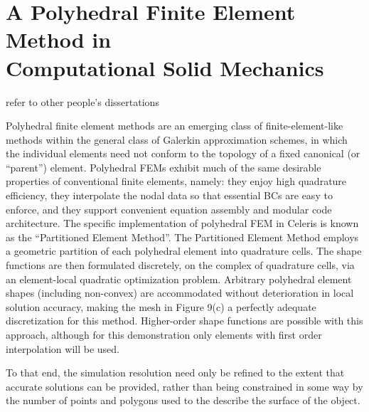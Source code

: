\section[A Polyhedral Finite Element Method in Computational Solid \\ Mechanics]{\texorpdfstring{A Polyhedral Finite Element Method in \\ Computational Solid Mechanics}{A Polyhedral Finite Element Method in Computational Solid \\ Mechanics}}
\label{A Polyhedral Finite Element Method in Computational Solid Mechanics}
refer to other people's dissertations


Polyhedral finite element methods are an emerging class of finite-element-like methods within the general class of Galerkin approximation schemes, in which the individual elements need not conform to the topology of a fixed canonical (or “parent”) element. Polyhedral FEMs exhibit much of the same desirable properties of conventional finite elements, namely: they enjoy high quadrature efficiency, they interpolate the nodal data so that essential BCs are easy to enforce, and they support convenient equation assembly and modular code architecture. The specific implementation of polyhedral FEM in Celeris is known as the “Partitioned Element Method”. The Partitioned Element Method employs a geometric partition of each polyhedral element into quadrature cells. The shape functions are then formulated discretely, on the complex of quadrature cells, via an element-local quadratic optimization problem. Arbitrary polyhedral element shapes (including non-convex) are accommodated without deterioration in local solution accuracy, making the mesh in Figure 9(c) a perfectly adequate discretization for this method. Higher-order shape functions are possible with this approach, although for this demonstration only elements with first order interpolation will be used.

To that end, the simulation resolution need only be refined to the extent that accurate solutions can be provided, rather than being constrained in some way by the number of points and polygons used to the describe the surface of the object.

